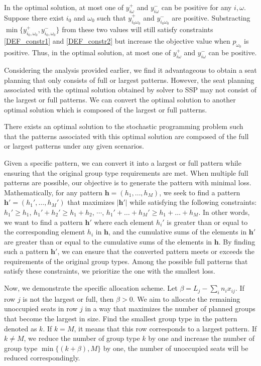 In the optimal solution, at most one of $y_{i \omega}^{+}$ and $y_{i \omega}^{-}$ can be positive for any $i, \omega$. Suppose there exist $i_0$ and $\omega_0$ such that $y_{i_0 \omega_0}^{+}$ and $y_{i_0 \omega_0}^{-}$ are positive. Substracting $\min\{y_{i_0, \omega_0}^{+}, y_{i_0, \omega_0}^{-}\}$ from these two values will still satisfy constraints \eqref{DEF_constr1} and \eqref{DEF_constr2} but increase the objective value when $p_{\omega_0}$ is positive. Thus, in the optimal solution, at most one of $y_{i \omega}^{+}$ and $y_{i \omega}^{-}$ can be positive.

Considering the analysis provided earlier, we find it advantageous to obtain a seat planning that only consists of full or largest patterns. However, the seat planning associated with the optimal solution obtained by solver to SSP may not consist of the largest or full patterns. We can convert the optimal solution to another optimal solution which is composed of the largest or full patterns.

\begin{prop}\label{prop_solution}
There exists an optimal solution to the stochastic programming problem such that the patterns associated with this optimal solution are composed of the full or largest patterns under any given scenarios.
\end{prop}

Given a specific pattern, we can convert it into a largest or full pattern while ensuring that the original group type requirements are met. When multiple full patterns are possible, our objective is to generate the pattern with minimal loss. Mathematically, for any pattern $\bm{h} = (h_1, \ldots, h_M)$, we seek to find a pattern $\bm{h}{'} = (h_1{'}, \ldots, h_M{'})$ that maximizes $|\bm{h}{'}|$ while satisfying the following constraints: $h_1{'} \geq h_1$, $h_1{'} + h_2{'} \geq h_1 + h_2$, $\cdots$, $h_1{'} + \ldots + h_M{'} \geq h_1 + \ldots + h_M$. In other words, we want to find a pattern $\bm{h}'$ where each element $h_i'$ is greater than or equal to the corresponding element $h_i$ in $\bm{h}$, and the cumulative sums of the elements in $\bm{h}'$ are greater than or equal to the cumulative sums of the elements in $\bm{h}$.
By finding such a pattern $\bm{h}'$, we can ensure that the converted pattern meets or exceeds the requirements of the original group types. Among the possible full patterns that satisfy these constraints, we prioritize the one with the smallest loss.

Now, we demonstrate the specific allocation scheme.
Let $\beta= L_{j} - \sum_{i} n_{i} x_{ij}$. If row $j$ is not the largest or full, then $\beta > 0$. 
We aim to allocate the remaining unoccupied seats in row $j$ in a way that maximizes the number of planned groups that become the largest in size. Find the smallest group type in the pattern denoted as $k$. If $k = M$, it means that this row corresponds to a largest pattern. If $k \neq M$, we reduce the number of group type $k$ by one and increase the number of group type $\min \{(k+\beta), M\}$ by one, the number of unoccupied seats will be reduced correspondingly.

